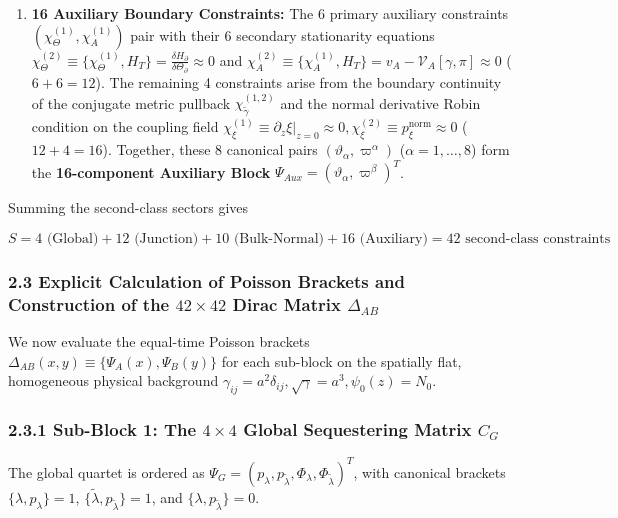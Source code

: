 \documentclass[aps,prd,onecolumn,superscriptaddress,nofootinbib,longbibliography,10pt]{revtex4-2}
\begin{document}
{{\begin{enumerate}
\item \textbf{16 Auxiliary Boundary Constraints:} The 6 primary auxiliary constraints \((\chi_\Theta^{(1)}, \chi_A^{(1)})\) pair with their 6 secondary stationarity equations \(\chi_\Theta^{(2)} \equiv \{\chi_\Theta^{(1)}, H_T\} = \frac{\delta H_\partial}{\delta\Theta_\partial} \approx 0\) and \(\chi_A^{(2)} \equiv \{\chi_A^{(1)}, H_T\} = v_A - \mathcal{V}_A[\gamma,\pi] \approx 0\) (\(6 + 6 = 12\)). The remaining 4 constraints arise from the boundary continuity of the conjugate metric pullback \(\chi_{\tilde{\gamma}}^{(1,2)}\) and the normal derivative Robin condition on the coupling field \(\chi_\xi^{(1)} \equiv \left.\partial_z\xi\right|_{z=0} \approx 0, \chi_\xi^{(2)} \equiv p_\xi^{\text{norm}} \approx 0\) (\(12 + 4 = 16\)). Together, these 8 canonical pairs \((\vartheta_\alpha, \varpi^\alpha)\) (\(\alpha = 1,\dots,8\)) form the \textbf{16-component Auxiliary Block} \(\Psi_{Aux} = (\vartheta_\alpha, \varpi^\beta)^T\).
  
\end{enumerate}

  Summing the second-class sectors gives


  \[ S = 4\text{ (Global)} + 12\text{ (Junction)} + 10\text{ (Bulk-Normal)} + 16\text{ (Auxiliary)} = 42\text{ second-class constraints} \]
  
  
\subsubsection*{2.3 Explicit Calculation of Poisson Brackets and Construction of the \(42 \times 42\) Dirac Matrix \(\Delta_{AB}\)}

  We now evaluate the equal-time Poisson brackets \(\Delta_{AB}(x,y) \equiv \{\Psi_A(x), \Psi_B(y)\}\) for each sub-block on the spatially flat, homogeneous physical background \(\gamma_{ij} = a^2\delta_{ij}, \sqrt{\gamma} = a^3, \psi_0(z) = N_0\).


  
\subsubsection*{2.3.1 Sub-Block 1: The \(4 \times 4\) Global Sequestering Matrix \(C_G\)}

  The global quartet is ordered as \(\Psi_G = (p_\lambda, p_{\tilde{\lambda}}, \Phi_\lambda, \Phi_{\tilde{\lambda}})^T\), with canonical brackets \(\{\lambda, p_\lambda\} = 1\), \(\{\tilde{\lambda}, p_{\tilde{\lambda}}\} = 1\), and \(\{\lambda, p_{\tilde{\lambda}}\} = 0\).


}}
\end{document}
